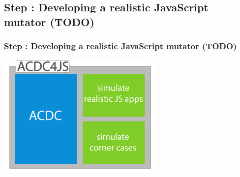 	
\subsection{Step \theStepCounter: Developing a realistic JavaScript mutator (TODO)}
\begin{frame}
	\frametitle{Step \theStepCounter: Developing a realistic JavaScript mutator (TODO)}
	\begin{center}
		\includegraphics[width=22em]{../imgs/acdc4js.pdf}
	\end{center}
\end{frame}

